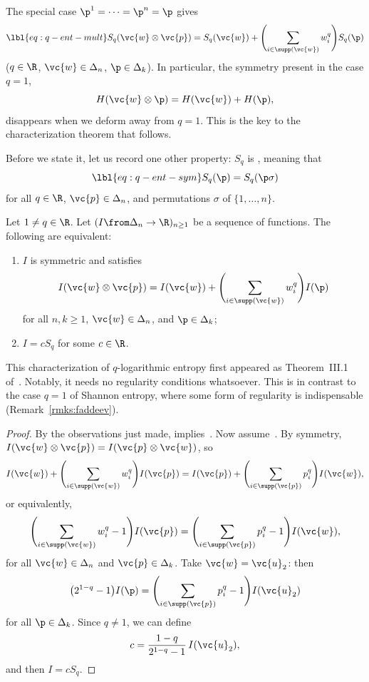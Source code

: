 The special case $\p^1 = \cdots = \p^n = \p$ gives
% 
\begin{equation}
\lbl{eq:q-ent-mult}
S_q( \vc{w} \otimes \vc{p})
=
S_q(\vc{w}) + \Biggl( \sum_{i \in \supp(\vc{w})} w_i^q \Biggr) S_q(\p)  
\end{equation}
% 
($q \in \R$, $\vc{w} \in \Delta_n$, $\p \in \Delta_k$).  In particular, the
symmetry present in the case $q = 1$,
\[
H(\vc{w} \otimes \p) = H(\vc{w}) + H(\p),
\]
disappears when we deform away from $q = 1$. This is the key to the
characterization theorem that follows.  

Before we state it, let us record one other property: $S_q$ is
,%
%
%
% 
meaning that
% 
\begin{equation}
\lbl{eq:q-ent-sym}
S_q(\p)
=
S_q(\p\sigma)
\end{equation}
% 
for all $q \in \R$, $\vc{p} \in \Delta_n$, and permutations $\sigma$ of
$\{1, \ldots, n\}$.

\begin{thm}
% 
Let $1 \neq q \in \R$.  Let $(I \from \Delta_n \to \R)_{n \geq 1}$ be a
sequence of functions.  The following are equivalent:
% 
\begin{enumerate}
\item 
{}
$I$ is symmetric and satisfies
\[
I( \vc{w} \otimes \vc{p})
=
I(\vc{w}) + \Biggl( \sum_{i \in \supp(\vc{w})} w_i^q \Biggr) I(\p)  
\]
for all $n, k \geq 1$, $\vc{w} \in \Delta_n$, and $\p \in \Delta_k$;

\item
{}
$I = cS_q$ for some $c \in \R$. 
\end{enumerate}
\end{thm}

This characterization of $q$-logarithmic entropy first appeared as
Theorem~III.1 of~\cite{SCRE}.  Notably, it needs no regularity conditions
whatsoever.  This is in contrast to the case $q = 1$ of Shannon entropy,
where some form of regularity is indispensable
(Remark~\ref{rmks:faddeev}).

\begin{proof}
By the observations just made, 
implies~.  Now
assume~.  By symmetry, $I(\vc{w} \otimes
\vc{p}) = I(\vc{p} \otimes \vc{w})$, so
\[
I(\vc{w}) + \Biggl( \sum_{i \in \supp(\vc{w})} w_i^q \Biggr) I(\vc{p})
=
I(\vc{p}) + \Biggl( \sum_{i \in \supp(\vc{p})} p_i^q \Biggr) I(\vc{w}),
\]
or equivalently,
\[
\Biggl( \sum_{i \in \supp(\vc{w})} w_i^q - 1 \Biggr) I(\vc{p})
=
\Biggl( \sum_{i \in \supp(\vc{p})} p_i^q - 1 \Biggr) I(\vc{w}),
\]
for all $\vc{w} \in \Delta_n$ and $\vc{p} \in \Delta_k$.  Take $\vc{w} =
\vc{u}_2$: then
\[
\bigl(2^{1 - q} - 1\bigr) I(\p)
=
\Biggl( \sum_{i \in \supp(\vc{p})} p_i^q - 1 \Biggr) I(\vc{u}_2)
\]
for all $\p \in \Delta_k$.  Since $q \neq 1$, we can define 
\[
c =
\frac{1 - q}{2^{1 - q} - 1}\,I(\vc{u}_2), 
\]
and then $I = cS_q$.
\end{proof}

